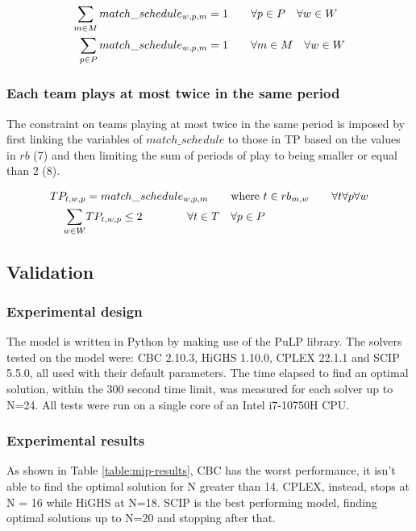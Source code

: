 \begin{align}
    \sum_{m \in M} match\_schedule_{w,p,m} &= 1 \hspace{20px} \forall p \in P \hspace{10px} \forall w \in W\\
    \sum_{p \in P} match\_schedule_{w,p,m} &= 1 \hspace{20px} \forall m \in M \hspace{10px}\forall w \in W
\end{align}

\subsubsection{Each team plays at most twice in the same period}
The constraint on teams playing at most twice in the same period is imposed by first linking the variables of $match\_schedule$ to those in TP based on the values in $rb$ (7) and then limiting the sum of periods of play to being smaller or equal than 2 (8). 

\begin{align}
    TP_{t,w,p} &= match\_schedule_{w,p,m} \hspace{20px} \text{where}\ t \in rb_{m, w} \hspace{20px} \forall t \forall p  \forall w\\
    \sum_{w \in W} &TP_{t,w,p} \leq 2 \hspace{40px} \forall t \in T \hspace{10px} \forall p \in P
\end{align}

\subsection{Validation}
\subsubsection*{Experimental design}
The model is written in Python by making use of the PuLP library. The solvers tested on the model were: CBC 2.10.3, HiGHS 1.10.0, CPLEX 22.1.1 and SCIP 5.5.0, all used with their default parameters. The time elapsed to find an optimal solution, within the 300 second time limit, was measured for each solver up to N=24. All tests were run on a single core of an Intel i7-10750H CPU.

\subsubsection*{Experimental results}
As shown in Table \ref{table:mip-results}, CBC has the worst performance, it isn't able to find the optimal solution for N greater than 14. CPLEX, instead, stops at N = 16 while HiGHS at N=18. SCIP is the best performing model, finding optimal solutions up to N=20 and stopping after that.


